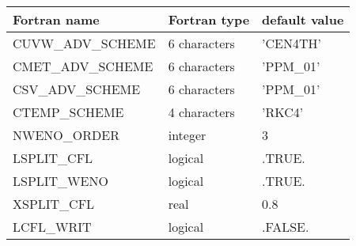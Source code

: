 \begin{center}
\begin{tabular} {|l|l|l|}
\hline
Fortran name & Fortran type & default value \\
\hline
CUVW\_ADV\_SCHEME   &  6 characters  & 'CEN4TH'   \\
CMET\_ADV\_SCHEME    &  6 characters  & 'PPM\_01'   \\
CSV\_ADV\_SCHEME    &  6 characters  & 'PPM\_01'   \\
CTEMP\_SCHEME    &  4 characters  & 'RKC4'   \\
NWENO\_ORDER    &  integer       & 3   \\
LSPLIT\_CFL   &  logical       & .TRUE.   \\
LSPLIT\_WENO   &  logical       & .TRUE.   \\
XSPLIT\_CFL   &  real          & 0.8      \\
LCFL\_WRIT  &  logical       & .FALSE.   \\
\hline
\end{tabular}
\end{center}


